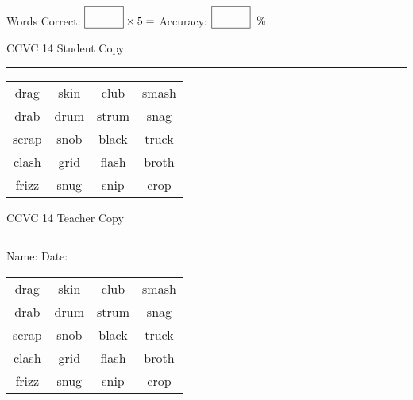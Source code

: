 \documentclass{memoir}
\begin{document}
\normalsize

Words Correct: $\fbox{\phantom{\huge 100}} \times 5 = $ Accuracy: $\fbox{\phantom{\huge 100}}\;\; \%$ 

\vfill

\newpage


\footnotesize \noindent
CCVC 14 \hfill Student Copy
\smallskip
\hrule

\Large

\setlength{\tabcolsep}{14pt}
\def\arraystretch{3}

{\selectfont


\begin{vplace}[0.5]
\begin{center}
\begin{tabular}{cccc}
drag        & skin & club & smash \\
drab             & drum & strum & snag \\
scrap & snob & black            & truck \\
clash            & grid & flash             & broth    \\
frizz & snug & snip & crop \\
\end{tabular}
\end{center}
\end{vplace}

}

\newpage

\footnotesize \noindent
CCVC 14 \hfill Teacher Copy
\smallskip
\hrule

\normalsize

\vfill

\noindent
Name: \underline{\hspace{1.75in}} \hfill Date: \underline{\hspace{1in}}

\Large

{\selectfont


\begin{vplace}[0.5]
\begin{center}
\begin{tabular}{cccc}
drag        & skin & club & smash \\
drab             & drum & strum & snag \\
scrap & snob & black            & truck \\
clash            & grid & flash             & broth    \\
frizz & snug & snip & crop \\
\end{tabular}
\end{center}
\end{vplace}



}
\end{document}

